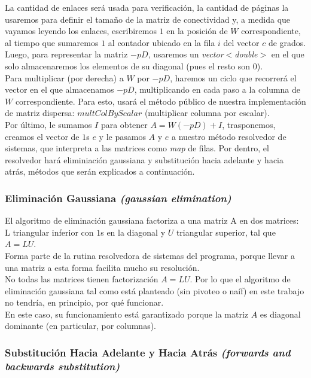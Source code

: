 		La cantidad de enlaces será usada para verificación, la cantidad de páginas la usaremos para definir el tamaño de la matriz de conectividad y, a medida que vayamos leyendo los enlaces, escribiremos $1$ en la posición de $W$ correspondiente, al tiempo que sumaremos $1$ al contador ubicado en la fila $i$ del vector $c$ de grados. \\

		Luego, para representar la matriz $-pD$, usaremos un \textit{vector$<$double$>$} en el que solo almacenaremos los elementos de su diagonal (pues el resto son $0$). \\

		Para multiplicar (por derecha) a $W$ por $-pD$, haremos un ciclo que recorrerá el vector en el que almacenamos $-pD$, multiplicando en cada paso a la columna de $W$ correspondiente. Para esto, usará el método público de nuestra implementación de matriz dispersa: $multColByScalar$ (multiplicar columna por escalar). \\

		Por último, le sumamos $I$ para obtener $A = W(-pD) + I$, trasponemos, creamos el vector de $1$s $e$ y le pasamos $A$ y $e$ a nuestro método resolvedor de sistemas, que interpreta a las matrices como \textit{map} de filas. Por dentro, el resolvedor hará eliminiación gaussiana y substitución hacia adelante y hacia atrás, métodos que serán explicados a continuación. \\

		\subsubsection{Eliminación Gaussiana \textit{(gaussian elimination)}}

			El algoritmo de eliminación gaussiana factoriza a una matriz A en dos matrices: L triangular inferior con $1$s en la diagonal y $U$ triangular superior, tal que $A = LU$. \\

			Forma parte de la rutina resolvedora de sistemas del programa, porque llevar a una matriz a esta forma facilita mucho su resolución. \\

			No todas las matrices tienen factorización $A=LU$. Por lo que el algoritmo de eliminación gaussiana tal como está planteado (sin pivoteo o naíf) en este trabajo no tendría, en principio, por qué funcionar. \\

			En este caso, su funcionamiento está garantizado porque la matriz $A$ es diagonal dominante (en particular, por columnas). \\

			

		\subsubsection{Substitución Hacia Adelante y Hacia Atrás \textit{(forwards and backwards substitution)}}



